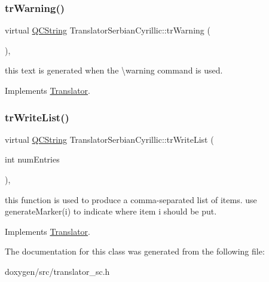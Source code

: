 \mbox{\label{class_translator_serbian_cyrillic_a80540cd63d9d8d3d947b6eef8846f680}} 
\subsubsection{\texorpdfstring{trWarning()}{trWarning()}}
{\footnotesize\ttfamily virtual \mbox{\hyperlink{class_q_c_string}{Q\+C\+String}} Translator\+Serbian\+Cyrillic\+::tr\+Warning (\begin{DoxyParamCaption}{ }\end{DoxyParamCaption})\hspace{0.3cm}{\ttfamily [inline]}, {\ttfamily [virtual]}}

this text is generated when the \textbackslash{}warning command is used. 

Implements \mbox{\hyperlink{class_translator}{Translator}}.

\mbox{\label{class_translator_serbian_cyrillic_a81566dcedef6e5bea69d42cbc36ce9d8}} 
\subsubsection{\texorpdfstring{trWriteList()}{trWriteList()}}
{\footnotesize\ttfamily virtual \mbox{\hyperlink{class_q_c_string}{Q\+C\+String}} Translator\+Serbian\+Cyrillic\+::tr\+Write\+List (\begin{DoxyParamCaption}\item[{int}]{num\+Entries }\end{DoxyParamCaption})\hspace{0.3cm}{\ttfamily [inline]}, {\ttfamily [virtual]}}

this function is used to produce a comma-\/separated list of items. use generate\+Marker(i) to indicate where item i should be put. 

Implements \mbox{\hyperlink{class_translator}{Translator}}.



The documentation for this class was generated from the following file\+:\begin{DoxyCompactItemize}
\item 
doxygen/src/translator\+\_\+sc.\+h\end{DoxyCompactItemize}
